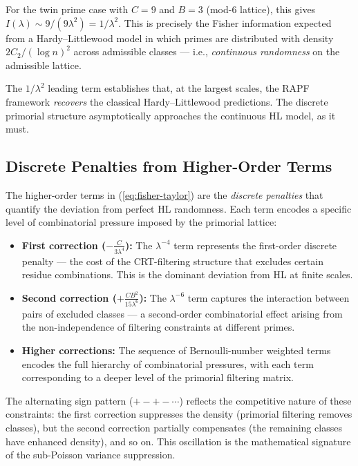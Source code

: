 \documentclass[11pt]{article}
\theoremstyle{remark}
\begin{document}
For the twin prime case with $C = 9$ and $B = 3$ (mod-6 lattice), this gives
$I(\lambda) \sim 9/(9 \lambda^2) = 1/\lambda^2$. This is precisely
the Fisher information expected from a Hardy--Littlewood model in which
primes are distributed with density $2C_2/(\log n)^2$ across admissible
classes — i.e., \emph{continuous randomness} on the admissible lattice.

The $1/\lambda^2$ leading term establishes that, at the largest scales,
the RAPF framework \emph{recovers} the classical Hardy--Littlewood
predictions. The discrete primorial structure asymptotically approaches
the continuous HL model, as it must.

\subsection{Discrete Penalties from Higher-Order Terms}

The higher-order terms in (\ref{eq:fisher-taylor}) are the \emph{discrete
penalties} that quantify the deviation from perfect HL randomness. Each
term encodes a specific level of combinatorial pressure imposed by the
primorial lattice:

\begin{itemize}
    \item \textbf{First correction ($-\frac{C}{3\lambda^4}$):} The
    $\lambda^{-4}$ term represents the first-order discrete penalty —
    the cost of the CRT-filtering structure that excludes certain residue
    combinations. This is the dominant deviation from HL at finite scales.
    
    \item \textbf{Second correction ($+\frac{CB^2}{15\lambda^6}$):}
    The $\lambda^{-6}$ term captures the interaction between pairs of
    excluded classes — a second-order combinatorial effect arising from
    the non-independence of filtering constraints at different primes.
    
    \item \textbf{Higher corrections:} The sequence of Bernoulli-number
    weighted terms encodes the full hierarchy of combinatorial pressures,
    with each term corresponding to a deeper level of the primorial
    filtering matrix.
\end{itemize}

The alternating sign pattern ($+ - + - \cdots$) reflects the
competitive nature of these constraints: the first correction suppresses
the density (primorial filtering removes classes), but the second
correction partially compensates (the remaining classes have enhanced
density), and so on. This oscillation is the mathematical signature of
the sub-Poisson variance suppression.
\end{document}
